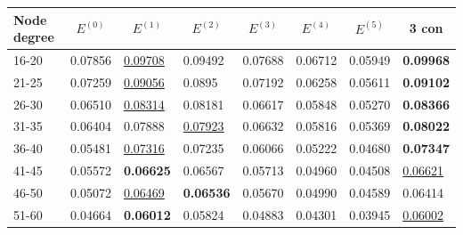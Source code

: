 \begin{table}[h!]
    \centering
    \begin{tabular}{|l|l|l|l|l|l|l||l|}
        \hline
        Node degree & \multicolumn{1}{c|}{$E^{(0)}$} & \multicolumn{1}{c|}{$E^{(1)}$} & \multicolumn{1}{c|}{$E^{(2)}$} & \multicolumn{1}{c|}{$E^{(3)}$} & \multicolumn{1}{c|}{$E^{(4)}$} & \multicolumn{1}{c|}{$E^{(5)}$} & \multicolumn{1}{c|}{3 con} \\ \hline
        16-20       & 0.07856                        & \underline{0.09708}            & 0.09492                        & 0.07688                        & 0.06712                        & 0.05949                        & \textbf{0.09968}           \\ \hline
        21-25       & 0.07259                        & \underline{0.09056}            & 0.0895                         & 0.07192                        & 0.06258                        & 0.05611                        & \textbf{0.09102}           \\ \hline
        26-30       & 0.06510                        & \underline{0.08314}            & 0.08181                        & 0.06617                        & 0.05848                        & 0.05270                        & \textbf{0.08366}           \\ \hline
        31-35       & 0.06404                        & 0.07888                        & \underline{0.07923}            & 0.06632                        & 0.05816                        & 0.05369                        & \textbf{0.08022}           \\ \hline
        36-40       & 0.05481                        & \underline{0.07316}            & 0.07235                        & 0.06066                        & 0.05222                        & 0.04680                        & \textbf{0.07347}           \\ \hline
        41-45       & 0.05572                        & \textbf{0.06625}               & 0.06567                        & 0.05713                        & 0.04960                        & 0.04508                        & \underline{0.06621}        \\ \hline
        46-50       & 0.05072                        & \underline{0.06469}            & \textbf{0.06536}               & 0.05670                        & 0.04990                        & 0.04589                        & 0.06414                    \\ \hline
        51-60       & 0.04664                        & \textbf{0.06012}               & 0.05824                        & 0.04883                        & 0.04301                        & 0.03945                        & \underline{0.06002}        \\ \hline

\end{tabular}
\end{table}
